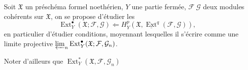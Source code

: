 Soit  $\mathfrak X$ un préschéma formel noethérien, $Y$ une partie fermée, $\mathcal F\ \mathcal G$ deux modules cohérents sur $\mathfrak X$, on se propose d'étudier les
\[
 \operatorname{Ext}^{\bullet}_Y(\mathfrak X;\mathcal F,\mathcal G)
 \Longleftarrow H^p_Y(\mathfrak X,\underline{\operatorname{Ext}}^q(\mathcal F,\mathcal G)),
\]
en particulier d'étudier  conditions, moyennant lesquelles il  s'écrire comme une limite projective $\varprojlim_n\operatorname{Ext}^{\bullet}_{Y}(\mathfrak X;\mathcal F,\mathcal G_n)$.
 
Noter d'ailleurs que $\operatorname{Ext}^{*}_Y(\mathfrak X,\mathcal F,\mathcal G_n)$

